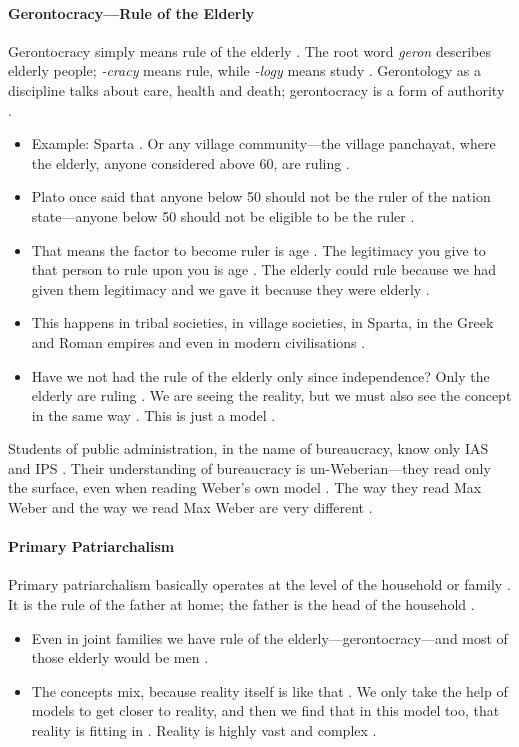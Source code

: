 \paragraph{Gerontocracy---Rule of the Elderly}
Gerontocracy simply means rule of the elderly . The root word \textit{geron} describes elderly people; \textit{-cracy} means rule, while \textit{-logy} means study . Gerontology as a discipline talks about care, health and death; gerontocracy is a form of authority .
\begin{itemize}
    \item Example: Sparta . Or any village community---the village panchayat, where the elderly, anyone considered above 60, are ruling .
    \item Plato once said that anyone below 50 should not be the ruler of the nation state---anyone below 50 should not be eligible to be the ruler .
    \item That means the factor to become ruler is age . The legitimacy you give to that person to rule upon you is age . The elderly could rule because we had given them legitimacy and we gave it because they were elderly .
    \item This happens in tribal societies, in village societies, in Sparta, in the Greek and Roman empires and even in modern civilisations .
    \item Have we not had the rule of the elderly only since independence? Only the elderly are ruling . We are seeing the reality, but we must also see the concept in the same way . This is just a model .
\end{itemize}

\begin{CriticalPoint}
Students of public administration, in the name of bureaucracy, know only IAS and IPS . Their understanding of bureaucracy is un-Weberian---they read only the surface, even when reading Weber's own model .
The way they read Max Weber and the way we read Max Weber are very different .
\end{CriticalPoint}

\paragraph{Primary Patriarchalism}
Primary patriarchalism basically operates at the level of the household or family . It is the rule of the father at home; the father is the head of the household .
\begin{itemize}
    \item Even in joint families we have rule of the elderly---gerontocracy---and most of those elderly would be men .
    \item The concepts mix, because reality itself is like that . We only take the help of models to get closer to reality, and then we find that in this model too, that reality is fitting in . Reality is highly vast and complex .
\end{itemize}

